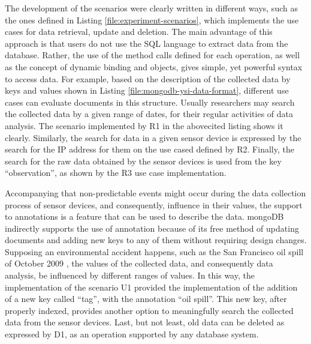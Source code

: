 The development of the scenarios were clearly written in different ways, such
as the ones defined in Listing \ref{file:experiment-scenarios}, which
implements the use cases for data retrieval, update and deletion. The main
advantage of this approach is that users do not use the SQL language to extract
data from the database. Rather, the use of the method calls defined for each
operation, as well as the concept of dynamic binding and objects, gives simple,
yet powerful syntax to access data. For example, based on the description
of the collected data by keys and values shown in Listing
\ref{file:mongodb-ysi-data-format}, different use cases can evaluate documents
in this structure. Usually researchers may search the collected data by a given
range of dates, for their regular activities of data analysis. The scenario
implemented by R1 in the abovecited listing shows it clearly. Similarly, the
search for data in a given sensor device is expressed by the search for the IP
address for them on the use cased defined by R2. Finally, the search for the
raw data obtained by the sensor devices is used from the key ``observation'',
as shown by the R3 use case implementation.

Accompanying that non-predictable events might occur during the data
collection process of sensor devices, and consequently, influence in their
values, the support to annotations is a feature that can be used to describe
the data. mongoDB indirectly supports the use of annotation because of its free
method of updating documents and adding new keys to any of them without
requiring design changes. Supposing an environmental accident happens, such as
the San Francisco oil spill of October 2009 \cite{sfbay-oilspill2009}, the
values of the collected data, and consequently data analysis, be influenced by
different ranges of values. In this way, the implementation of the scenario U1
provided the implementation of the addition of a new key called ``tag'', with
the annotation ``oil spill''. This new key, after properly indexed, provides
another option to meaningfully search the collected data from the sensor
devices. Last, but not least, old data can be deleted as expressed by D1, as an
operation supported by any database system.

